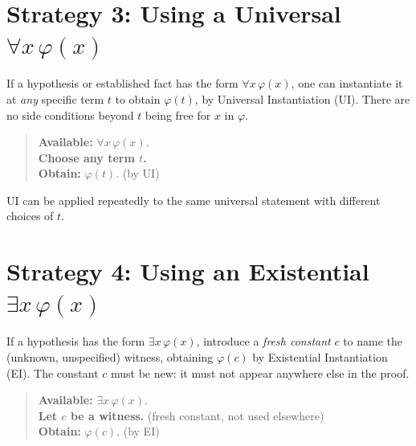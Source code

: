 
\section*{Strategy 3: Using a Universal $\forall x\,\varphi(x)$}

\begin{exposition}
If a hypothesis or established fact has the form $\forall x\,\varphi(x)$, one
can instantiate it at \emph{any} specific term $t$ to obtain $\varphi(t)$, by
Universal Instantiation (UI). There are no side conditions beyond $t$ being
free for $x$ in $\varphi$.
\end{exposition}

\begin{quote}
\textbf{Available:} $\forall x\,\varphi(x)$.\\
\textbf{Choose any term $t$.}\\
\textbf{Obtain:} $\varphi(t)$. \quad (by UI)
\end{quote}

\begin{exposition}
UI can be applied repeatedly to the same universal statement with different
choices of $t$.
\end{exposition}


\section*{Strategy 4: Using an Existential $\exists x\,\varphi(x)$}

\begin{exposition}
If a hypothesis has the form $\exists x\,\varphi(x)$, introduce a \emph{fresh
constant} $c$ to name the (unknown, unspecified) witness, obtaining $\varphi(c)$
by Existential Instantiation (EI). The constant $c$ must be new: it must not
appear anywhere else in the proof.
\end{exposition}

\begin{quote}
\textbf{Available:} $\exists x\,\varphi(x)$.\\
\textbf{Let $c$ be a witness.} (fresh constant, not used elsewhere)\\
\textbf{Obtain:} $\varphi(c)$. \quad (by EI)
\end{quote}

